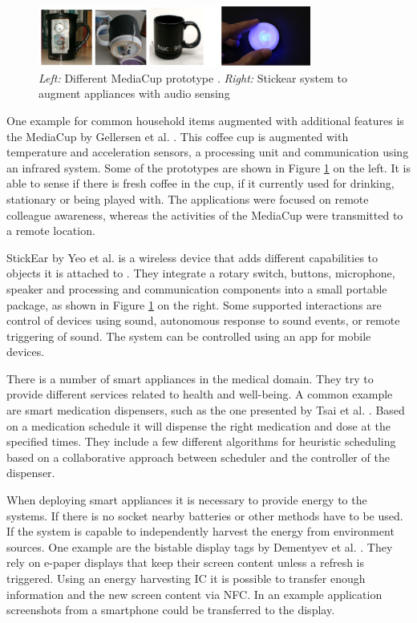 \begin{figure}[ht]
\centering
\includegraphics[width=0.8\textwidth]{images/rel_app_appliances}
\caption{\emph{Left:} Different MediaCup prototype \cite{gellersen1999mediacup}. \emph{Right:} Stickear system to augment appliances with audio sensing \cite{yeo2013stickear}}
\label{fig:rel_app_appliances}
\end{figure}	

One example for common household items augmented with additional features is the MediaCup by Gellersen et al. \cite{gellersen1999mediacup}. This coffee cup is augmented with temperature and acceleration sensors, a processing unit and communication using an infrared system. Some of the prototypes are shown in Figure \ref{fig:rel_app_appliances} on the left. It is able to sense if there is fresh coffee in the cup, if it currently used for drinking, stationary or being played with. The applications were focused on remote colleague awareness, whereas the activities of the MediaCup were transmitted to a remote location.

StickEar by Yeo et al. is a wireless device that adds different capabilities to objects it is attached to \cite{yeo2013stickear}. They integrate a rotary switch, buttons, microphone, speaker and processing and communication components into a small portable package, as shown in Figure \ref{fig:rel_app_appliances} on the right. Some supported interactions are control of devices using sound, autonomous response to sound events, or remote triggering of sound. The system can be controlled using an app for mobile devices.

There is a number of smart appliances in the medical domain. They try to provide different services related to health and well-being. A common example are smart medication dispensers, such as the one presented by Tsai et al. \cite{tsai2011smart}. Based on a medication schedule it will dispense the right medication and dose at the specified times. They include a few different algorithms for heuristic scheduling based on a collaborative approach between scheduler and the controller of the dispenser.

When deploying smart appliances it is necessary to provide energy to the systems. If there is no socket nearby batteries or other methods have to be used. If the system is capable to independently harvest the energy from environment sources. One example are the bistable display tags by Dementyev et al. \cite{dementyev2013wirelessly}. They rely on e-paper displays that keep their screen content unless a refresh is triggered. Using an energy harvesting IC it is possible to transfer enough information and the new screen content via NFC. In an example application screenshots from a smartphone could be transferred to the display.

